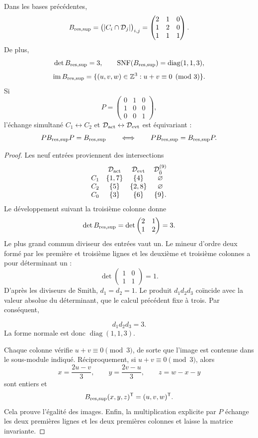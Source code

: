 \begin{theorem}
\label{thm:incidencia-residuo-soporte} Dans les bases précédentes,
\[
 B_{\rm res,sup}
 =\bigl(|C_i\cap\mathcal D_j|\bigr)_{i,j}
 =
 \begin{pmatrix}
 2&1&0\\
 1&2&0\\
 1&1&1
 \end{pmatrix}.
\]
De plus,
\[
 \det B_{\rm res,sup}=3,\qquad
 \operatorname{SNF}(B_{\rm res,sup})
 =\operatorname{diag}(1,1,3),
\]
\[
 \operatorname{im}B_{\rm res,sup}
 =\{(u,v,w)\in\mathbb Z^3:u+v\equiv0\pmod3\}.
\]
Si
\[
 P=\begin{pmatrix}0&1&0\\1&0&0\\0&0&1\end{pmatrix},
\]
l’échange simultané \(C_1\leftrightarrow C_2\) et \(\mathcal D_{\rm act}\leftrightarrow\mathcal D_{\rm evt}\) est équivariant :
\[
 P B_{\rm res,sup}P=B_{\rm res,sup}
 \qquad\Longleftrightarrow\qquad
 PB_{\rm res,sup}=B_{\rm res,sup}P.
\]
\end{theorem}

\begin{proof}
Les neuf entrées proviennent des intersections
\[
\begin{array}{cccc}
 &\mathcal D_{\rm act}&\mathcal D_{\rm evt}
 &\mathcal D_{\bar0}^{(9)}\\
 C_1&\{1,7\}&\{4\}&\varnothing\\
 C_2&\{5\}&\{2,8\}&\varnothing\\
 C_0&\{3\}&\{6\}&\{9\}.
\end{array}
\]
Le développement suivant la troisième colonne donne
\[
 \det B_{\rm res,sup}
 =\det\begin{pmatrix}2&1\\1&2\end{pmatrix}=3.
\]
Le plus grand commun diviseur des entrées vaut un. Le mineur d’ordre deux formé par les première et troisième lignes et les deuxième et troisième colonnes a pour déterminant un :
\[
 \det\begin{pmatrix}1&0\\1&1\end{pmatrix}=1.
\]
D’après les diviseurs de Smith, \(d_1=d_2=1\). Le produit \(d_1d_2d_3\) coïncide avec la valeur absolue du déterminant, que le calcul précédent fixe à trois. Par conséquent,

\[
 d_1d_2d_3=3.
\]
La forme normale est donc \(\operatorname{diag}(1,1,3)\).

Chaque colonne vérifie \(u+v\equiv0\pmod3\), de sorte que l’image est contenue dans le sous-module indiqué. Réciproquement, si \(u+v\equiv0\pmod3\), alors
\[
 x=\frac{2u-v}{3},\qquad
 y=\frac{2v-u}{3},\qquad
 z=w-x-y
\]
sont entiers et
\[
 B_{\rm res,sup}(x,y,z)^{\mathsf T}=(u,v,w)^{\mathsf T}.
\]
Cela prouve l’égalité des images. Enfin, la multiplication explicite par \(P\) échange les deux premières lignes et les deux premières colonnes et laisse la matrice invariante.
\end{proof}

